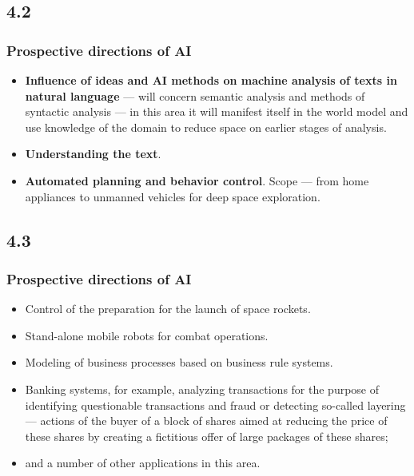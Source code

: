 \documentclass[default]{beamer}
\begin{document}
	\subsection{4.2}
	\begin{frame}
		\frametitle{Prospective directions of AI}
		
		\begin{itemize}
			\item \textbf {Influence of ideas and AI methods on machine analysis of texts in natural language} --- will concern semantic analysis and methods of syntactic analysis --- in this area it will manifest itself in the world model and use knowledge of the domain to reduce space on earlier stages of analysis.
			\item \textbf {Understanding the text}.
			\item \textbf {Automated planning and behavior control}. Scope --- from home appliances to unmanned vehicles for deep space exploration.
		\end{itemize}
		
	\end{frame}

	\subsection{4.3}
	\begin{frame}
		\frametitle{Prospective directions of AI}
		
		\begin{itemize}
			\item Control of the preparation for the launch of space rockets.
			\item Stand-alone mobile robots for combat operations.
			\item Modeling of business processes based on business rule systems.
			\item Banking systems, for example, analyzing transactions for the purpose of identifying questionable transactions and fraud or detecting so-called layering --- actions of the buyer of a block of shares aimed at reducing the price of these shares by creating a fictitious offer of large packages of these shares;
			\item and a number of other applications in this area.
			
		\end{itemize}
		
	\end{frame}
\end{document}
